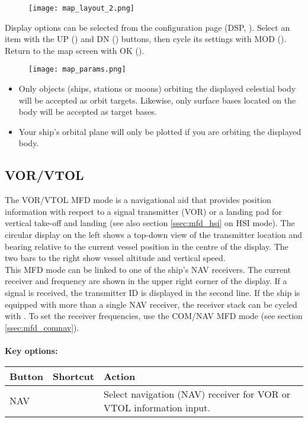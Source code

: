 \documentclass[Orbiter User Manual.tex]{subfiles}
\begin{document}
\begin{figure}[H]
  \centering
  \texttt{[image: map\_layout\_2.png]}
\end{figure}

\noindent
Display options can be selected from the configuration page (DSP, \Shift{}). Select an item with the UP (\Shift\keystroke{-}) and DN (\Shift\keystroke{=}) buttons, then cycle its settings with MOD (\Shift{}). Return to the map screen with OK (\Shift{}).

\begin{figure}[H]
  \centering
  \texttt{[image: map\_params.png]}
\end{figure}

\begin{itemize}
\item Only objects (ships, stations or moons) orbiting the displayed celestial body will be accepted as orbit targets. Likewise, only surface bases located on the body will be accepted as target bases.
\item Your ship's orbital plane will only be plotted if you are orbiting the displayed body.
\end{itemize}


\subsection{VOR/VTOL}
The VOR/VTOL MFD mode is a navigational aid that provides position information with respect to a signal transmitter (VOR) or a landing pad for vertical take-off and landing (see also section \ref{ssec:mfd_hsi} on HSI mode). The circular display on the left shows a top-down view of the transmitter location and bearing relative to the current vessel position in the centre of the display. The two bars to the right show vessel altitude and vertical speed.\\
This MFD mode can be linked to one of the ship's NAV receivers. The current receiver and frequency are shown in the upper right corner of the display. If a signal is received, the transmitter ID is displayed in the second line. If the ship is equipped with more than a single NAV receiver, the receiver stack can be cycled with \Shift{}. To set the receiver frequencies, use the COM/NAV MFD mode (see section \ref{ssec:mfd_comnav}).\\
\\
\textbf{Key options:}

	\begin{longtable}{ |p{}|p{}|p{}| }
	\hline\rule{0pt}{2ex}
	\textbf{Button} & \textbf{Shortcut} & \textbf{Action}\\
	\hline\rule{0pt}{2ex}
	NAV & \Shift\keystroke{N} & Select navigation (NAV) receiver for VOR or VTOL information input.\\
	\hline
	\end{longtable}
\end{document}
